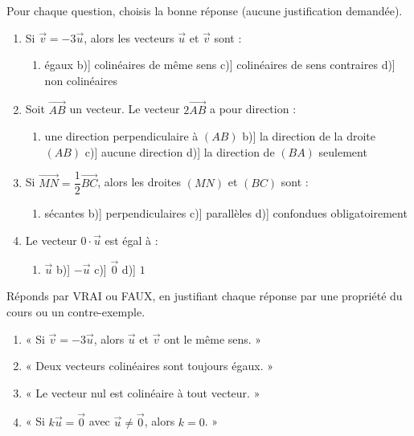 \documentclass[11pt]{article}
\begin{document}
\begin{exercice}
Pour chaque question, choisis la bonne réponse (aucune justification demandée).
\begin{enumerate}
\item Si $\vec{v} = -3\vec{u}$, alors les vecteurs $\vec{u}$ et $\vec{v}$ sont :
\begin{enumerate}
\item[a)] égaux \quad b)] colinéaires de même sens \quad c)] colinéaires de sens contraires \quad d)] non colinéaires
\end{enumerate}
\item Soit $\overrightarrow{AB}$ un vecteur. Le vecteur $2\overrightarrow{AB}$ a pour direction :
\begin{enumerate}
\item[a)] une direction perpendiculaire à $(AB)$ \quad b)] la direction de la droite $(AB)$ \quad c)] aucune direction \quad d)] la direction de $(BA)$ seulement
\end{enumerate}
\item Si $\overrightarrow{MN} = \dfrac{1}{2}\overrightarrow{BC}$, alors les droites $(MN)$ et $(BC)$ sont :
\begin{enumerate}
\item[a)] sécantes \quad b)] perpendiculaires \quad c)] parallèles \quad d)] confondues obligatoirement
\end{enumerate}
\item Le vecteur $0 \cdot \vec{u}$ est égal à :
\begin{enumerate}
\item[a)] $\vec{u}$ \quad b)] $-\vec{u}$ \quad c)] $\vec{0}$ \quad d)] $1$
\end{enumerate}
\end{enumerate}
\end{exercice}

\begin{exercice}
Réponds par VRAI ou FAUX, en justifiant chaque réponse par une propriété du cours ou un contre-exemple.
\begin{enumerate}
\item « Si $\vec{v} = -3\vec{u}$, alors $\vec{u}$ et $\vec{v}$ ont le même sens. »
\item « Deux vecteurs colinéaires sont toujours égaux. »
\item « Le vecteur nul est colinéaire à tout vecteur. »
\item « Si $k\vec{u} = \vec{0}$ avec $\vec{u} \neq \vec{0}$, alors $k = 0$. »
\end{enumerate}
\end{exercice}
\end{document}
